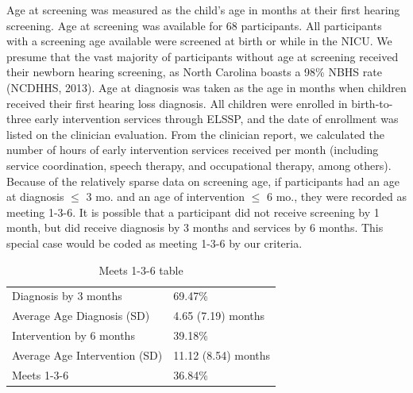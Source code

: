 \documentclass[english,man]{apa6}
\begin{document}
Age at screening was measured as the child's age in months at their first hearing screening. Age at screening was available for 68 participants. All participants with a screening age available were screened at birth or while in the NICU. We presume that the vast majority of participants without age at screening received their newborn hearing screening, as North Carolina boasts a 98\% NBHS rate (NCDHHS, 2013). Age at diagnosis was taken as the age in months when children received their first hearing loss diagnosis. All children were enrolled in birth-to-three early intervention services through ELSSP, and the date of enrollment was listed on the clinician evaluation. From the clinician report, we calculated the number of hours of early intervention services received per month (including service coordination, speech therapy, and occupational therapy, among others).
Because of the relatively sparse data on screening age, if participants had an age at diagnosis \(\leq\) 3 mo. and an age of intervention \(\leq\) 6 mo., they were recorded as meeting 1-3-6. It is possible that a participant did not receive screening by 1 month, but did receive diagnosis by 3 months and services by 6 months. This special case would be coded as meeting 1-3-6 by our criteria.

\begin{table}[!h]

\caption{\label{tab:meets136-info}Meets 1-3-6 table}
\centering
\begin{tabular}[t]{l|l}
\hline
 & \\
\hline
Diagnosis by 3 months & 69.47\%\\
\hline
Average Age Diagnosis (SD) & 4.65 (7.19) months\\
\hline
Intervention by 6 months & 39.18\%\\
\hline
Average Age Intervention (SD) & 11.12 (8.54) months\\
\hline
Meets 1-3-6 & 36.84\%\\
\hline
\end{tabular}
\end{table}
\end{document}
